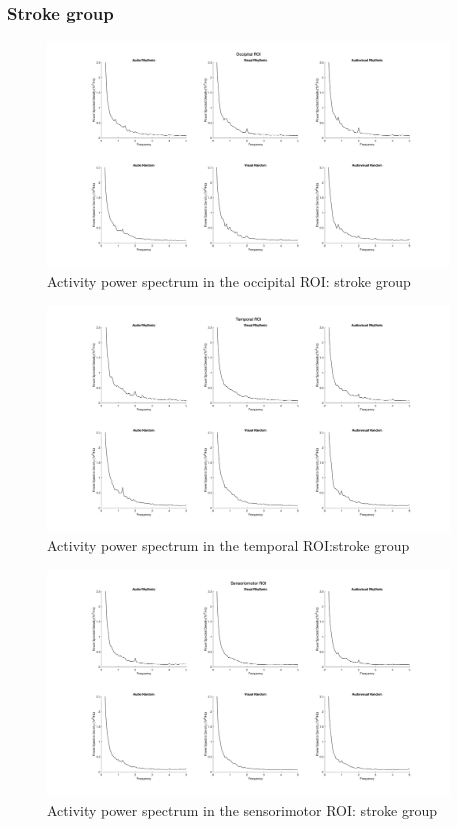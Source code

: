 \subsubsection*{Stroke group}
\begin{figure}[H]
    \centering
    \includegraphics[width=0.95\textwidth]{stroke_images/occipital_roi.png}
    \caption{Activity power spectrum in the occipital ROI: stroke group}
    \label{fig: occipital ROI: stroke}
\end{figure}
\begin{figure}[H]
    \centering
    \includegraphics[width=0.95\textwidth]{stroke_images/temporal_roi.png}
    \caption{Activity power spectrum in the temporal ROI:stroke group}
    \label{fig: temporal ROI: stroke}
\end{figure}
\begin{figure}[H]
    \centering
    \includegraphics[width=0.95\textwidth]{stroke_images/sensorimotor_roi.png}
    \caption{Activity power spectrum in the sensorimotor ROI: stroke group}
    \label{fig: sensorimotor ROI: stroke} 
\end{figure} 
\vfill

